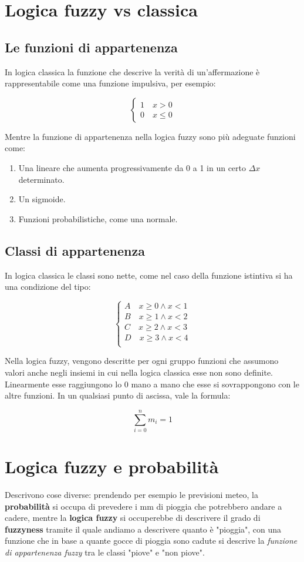 \documentclass[\main/main.tex]{subfiles}
\begin{document}
\section{Logica fuzzy vs classica}
\subsection{Le funzioni di appartenenza}
In logica classica la funzione che descrive la verità di un'affermazione è rappresentabile come una funzione impulsiva, per esempio:

\[
	\begin{cases}
		1 \quad x > 0    \\
		0 \quad x \leq 0
	\end{cases}
\]

Mentre la funzione di appartenenza nella logica fuzzy sono più adeguate funzioni come:

\begin{enumerate}
	\item Una lineare che aumenta progressivamente da 0 a 1 in un certo $\Delta x$ determinato.
	\item Un sigmoide.
	\item Funzioni probabilistiche, come una normale.
\end{enumerate}

\subsection{Classi di appartenenza}
In logica classica le classi sono nette, come nel caso della funzione istintiva si ha una condizione del tipo:

\[
	\begin{cases}
		A \quad x \geq 0 \wedge x<1 \\
		B \quad x \geq 1 \wedge x<2 \\
		C \quad x \geq 2 \wedge x<3 \\
		D \quad x \geq 3 \wedge x<4 \\
	\end{cases}
\]

Nella logica fuzzy, vengono descritte per ogni gruppo funzioni che assumono valori anche negli insiemi in cui nella logica classica esse non sono definite. Linearmente esse raggiungono lo 0 mano a mano che esse si sovrappongono con le altre funzioni. In un qualsiasi punto di ascissa, vale la formula:

\[
	\sum_{i=0}^{n} m_i = 1
\]

\section{Logica fuzzy e probabilità}
Descrivono cose diverse: prendendo per esempio le previsioni meteo, la \textbf{probabilità} si occupa di prevedere i mm di pioggia che potrebbero andare a cadere, mentre la \textbf{logica fuzzy} si occuperebbe di descrivere il grado di \textbf{fuzzyness} tramite il quale andiamo a descrivere quanto è "pioggia", con una funzione che in base a quante gocce di pioggia sono cadute si descrive la \textit{funzione di appartenenza fuzzy} tra le classi "piove" e "non piove".
\end{document}
